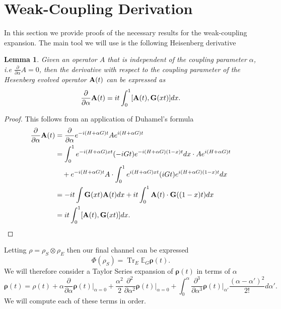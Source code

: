 \documentclass[
 amsmath,amssymb,
 aps,
onecolumn, 
nofootinbib]{revtex4-2}
\newtheorem{lemma}[theorem]{Lemma}
\newcommand{\EE}{\mathbb{E}}
\DeclareMathOperator{\Tr}{Tr}
\newcommand{\tp}{\otimes}
\begin{document}
\section{Weak-Coupling Derivation}
In this section we provide proofs of the necessary results for the weak-coupling expansion. The main tool we will use is the following Heisenberg derivative
\begin{lemma}
    Given an operator $A$ that is independent of the coupling parameter $\alpha$, i.e $\frac{\partial}{\partial \alpha} A = 0$, then the derivative with respect to the coupling parameter of the Hesenberg evolved operator $\bold{A}(t)$ can be expressed as
    \begin{equation}
        \frac{\partial}{\partial \alpha} \bold{A}(t) = i t \int_0^1 [\bold{A}(t), \bold{G}(x t)] dx.
    \end{equation}
\end{lemma} \label{lem:heisenberg_derivative}
\begin{proof}
    This follows from an application of Duhamel's formula
    \begin{align}
        \frac{\partial}{\partial \alpha} \bold{A}(t) &= \frac{\partial }{\partial \alpha} e^{-i (H + \alpha G ) t} A e^{i (H + \alpha G) t} \\
        &= \int_0^1 e^{-i (H + \alpha G) x t} (-i G t) e^{-i (H + \alpha G)(1 - x) t} dx \cdot A e^{i (H + \alpha G)t} \\
        &\quad+ e^{-i (H + \alpha G)t} A \cdot \int_0^1 e^{i (H + \alpha G) x t} (i G t) e^{i (H + \alpha G) (1- x) t} d x \\
        &= -i t\int \bold{G}(x t) \bold{A}(t) d x + it \int_0^1 \bold{A}(t) \cdot \bold{G}((1 - x)t) d x \\
        &= i t \int_0^1 [\bold{A}(t) , \bold{G}(x t)] dx.
    \end{align}
\end{proof}


Letting $\rho = \rho_S \tp \rho_E$ then our final channel can be expressed 
\begin{equation}
    \Phi(\rho_S) = \Tr_E \EE_G \boldsymbol{\rho}(t).
\end{equation}
We will therefore consider a Taylor Series expansion of $\boldsymbol{\rho}(t)$ in terms of $\alpha$
\begin{equation}
    \boldsymbol{\rho}(t) = \rho(t) + \alpha \frac{\partial}{\partial \alpha} \boldsymbol{\rho}(t) \bigg|_{\alpha = 0} + \frac{\alpha^2}{2} \frac{\partial^2}{\partial \alpha^2} \boldsymbol{\rho}(t) \bigg|_{\alpha = 0} + \int_{0}^\alpha \frac{\partial^3}{\partial \alpha^3} \boldsymbol{\rho}(t) \bigg|_{\alpha'} \frac{(\alpha - \alpha')^2}{2!} d\alpha'.
\end{equation}
We will compute each of these terms in order.
\end{document}
